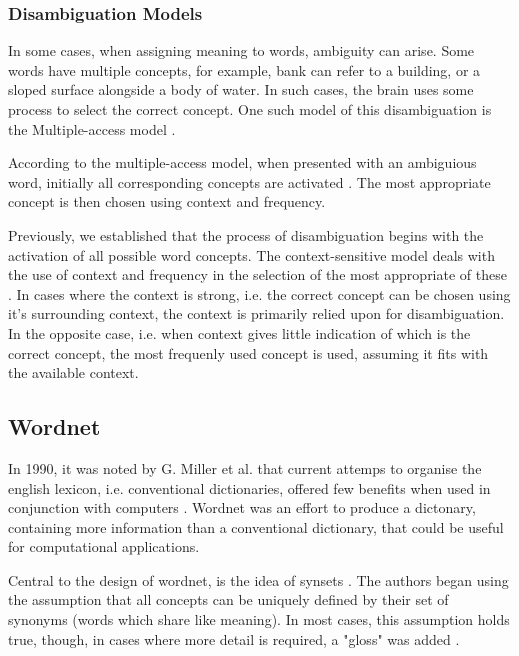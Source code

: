 \documentclass[]{article}
\begin{document}
\subsubsection{Disambiguation Models}
\label{sec:DisambiguationModels}
In some cases, when assigning meaning to words, ambiguity can arise. Some words have multiple concepts, for example, bank can refer to a building, or a sloped surface alongside a body of water. In such cases, the brain uses some process to select the correct concept. One such model of this disambiguation is the Multiple-access model \cite{PsychologyOfLanguage}.

According to the multiple-access model, when presented with an ambiguious word, initially all corresponding concepts are activated \cite{AccessingLexicalAmbiguities}. The most appropriate concept is then chosen using context and frequency.

Previously, we established that the process of disambiguation begins with the activation of all possible word concepts. The context-sensitive model deals with the use of context and frequency in the selection of the most appropriate of these \cite{PsychologyOfLanguage}. In cases where the context is strong, i.e. the correct concept can be chosen using it's surrounding context, the context is primarily relied upon for disambiguation. In the opposite case, i.e. when context gives little indication of which is the correct concept, the most frequenly used concept is used, assuming it fits with the available context.


\subsection{Wordnet}
\label{Wordnet}
In 1990, it was noted by G. Miller et al. that current attemps to organise the english lexicon, i.e. conventional dictionaries, offered few benefits when used in conjunction with computers \cite{WN1Introduction}. Wordnet was an effort to produce a dictonary, containing more information than a conventional dictionary, that could be useful for computational applications.

\label{Synsets}Central to the design of wordnet, is the idea of synsets \cite{WN1Introduction}. The authors began using the assumption that all concepts can be uniquely defined by their set of synonyms (words which share like meaning). In most cases, this assumption holds true, though, in cases where more detail is required, a "gloss" was added \cite{WN1Introduction}.
\end{document}
